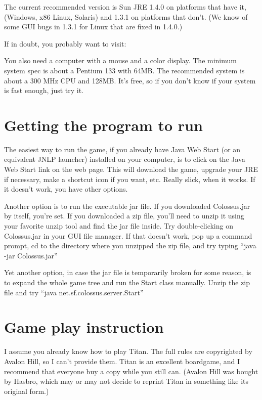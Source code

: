 \documentclass{article}
\begin{document}
The current recommended version is Sun JRE 1.4.0 on platforms that have it, 
(Windows, x86 Linux, Solaris) and 1.3.1 on platforms that don't.  (We know 
of some GUI bugs in 1.3.1 for Linux that are fixed in 1.4.0.)

If in doubt, you probably want to visit:

You also need a computer with a mouse and a color display.  The minimum
system spec is about a Pentium 133 with 64MB.  The recommended system
is about a 300 MHz CPU and 128MB.  It's free, so if you don't know if
your system is fast enough, just try it.

\section{Getting the program to run}

The easiest way to run the game, if you already have Java Web Start (or
an equivalent JNLP launcher) installed on your computer, is to click on 
the Java Web Start link on the web page. This will download the game, 
upgrade your JRE if necessary, make a shortcut icon if you want, etc.
Really slick, when it works. If it doesn't work, you have other options.

Another option is to run the executable jar file. If you downloaded 
Colossus.jar by itself, you're set. If you downloaded a zip file, you'll 
need to unzip it using your favorite unzip tool and find the jar file 
inside. Try double-clicking on Colossus.jar in your GUI file manager. 
If that doesn't work, pop up a command prompt, cd to the directory where 
you unzipped the zip file, and try typing ``java -jar Colossus.jar''

Yet another option, in case the jar file is temporarily broken for some
reason, is to expand the whole game tree and run the Start class manually. 
Unzip the zip file and try ``java net.sf.colossus.server.Start''

\section{Game play instruction}

I assume you already know how to play Titan. The full rules are copyrighted 
by Avalon Hill, so I can't provide them. Titan is an excellent boardgame, 
and I recommend that everyone buy a copy while you still can. (Avalon Hill 
was bought by Hasbro, which may or may not decide to reprint Titan in 
something like its original form.)
\end{document}
